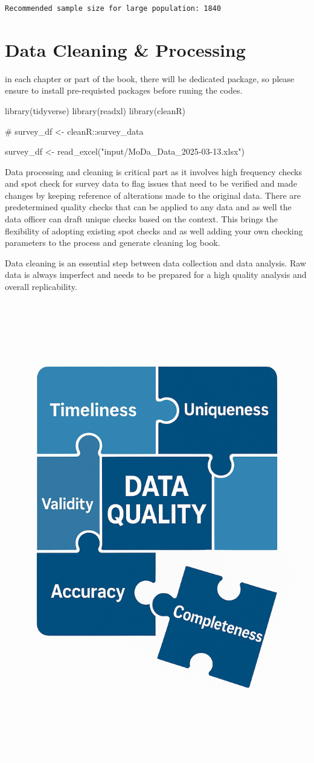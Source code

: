 \documentclass[
  letterpaper,
  DIV=11,
  numbers=noendperiod]{scrreprt}
\newenvironment{Shaded}{\begin{snugshade}}{\end{snugshade}}
\newcommand{\CommentTok}[1]{\textcolor[rgb]{0.37,0.37,0.37}{#1}}
\newcommand{\FunctionTok}[1]{\textcolor[rgb]{0.28,0.35,0.67}{#1}}
\newcommand{\NormalTok}[1]{\textcolor[rgb]{0.00,0.23,0.31}{#1}}
\newcommand{\OtherTok}[1]{\textcolor[rgb]{0.00,0.23,0.31}{#1}}
\newcommand{\StringTok}[1]{\textcolor[rgb]{0.13,0.47,0.30}{#1}}
\begin{document}
\begin{verbatim}
Recommended sample size for large population: 1840 
\end{verbatim}


\chapter{Data Cleaning \& Processing}\label{data-cleaning-processing}

in each chapter or part of the book, there will be dedicated package, so
please ensure to install pre-requisted packages before runing the codes.

\begin{Shaded}
\begin{Highlighting}[]
\FunctionTok{library}\NormalTok{(tidyverse)}
\FunctionTok{library}\NormalTok{(readxl)}
\FunctionTok{library}\NormalTok{(cleanR)}

\CommentTok{\# survey\_df \textless{}{-} cleanR::survey\_data}

\NormalTok{survey\_df }\OtherTok{\textless{}{-}} \FunctionTok{read\_excel}\NormalTok{(}\StringTok{"input/MoDa\_Data\_2025{-}03{-}13.xlsx"}\NormalTok{)}
\end{Highlighting}
\end{Shaded}

Data processing and cleaning is critical part as it involves high
frequency checks and spot check for survey data to flag issues that need
to be verified and made changes by keeping reference of alterations made
to the original data. There are predetermined quality checks that can be
applied to any data and as well the data officer can draft unique checks
based on the context. This brings the flexibility of adopting existing
spot checks and as well adding your own checking parameters to the
process and generate cleaning log book.

Data cleaning is an essential step between data collection and data
analysis. Raw data is always imperfect and needs to be prepared for a
high quality analysis and overall replicability.

\includegraphics[width=0.4\linewidth,height=\textheight,keepaspectratio]{assets/chapter_2_cover.png}
\end{document}
